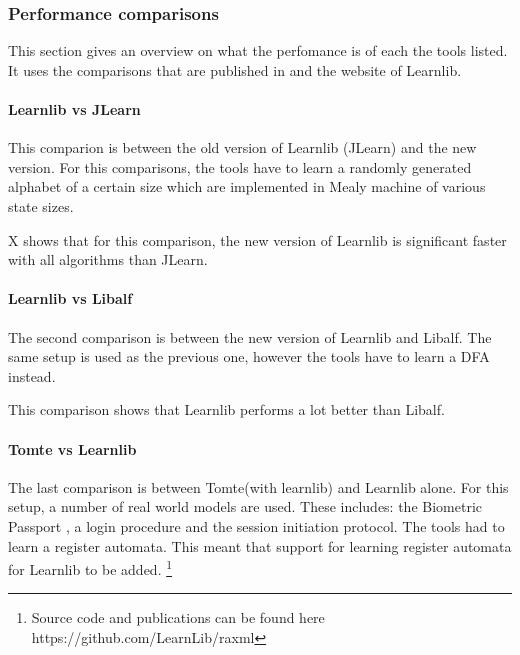 \documentclass[multi,crop=false,class=article]{standalone}
\begin{document}
\subsubsection{Performance comparisons}
\label{ssec:performance_compare}
This section gives an overview on what the perfomance is of each the tools
listed. It uses the comparisons that are published in
\cite{Aarts2014}\cite{Aarts2015} and
the website of
Learnlib.

\paragraph{Learnlib vs JLearn}

\todo{Image of comparison between Learnlib and JLearn] }
This comparion is between the old version of Learnlib (JLearn) and the new
version. For this comparisons, the tools have to learn a randomly generated
alphabet of a certain size which are implemented in Mealy machine of various
state sizes.

X shows that for this comparison, the new version of Learnlib is
significant faster with all algorithms than JLearn.

\paragraph{Learnlib vs Libalf}
The second comparison is between the new version of Learnlib and Libalf.
The same setup is used as the previous one, however the tools have to learn a
DFA instead.

This comparison shows that Learnlib performs a lot better than Libalf.

\paragraph{Tomte vs Learnlib}
The last comparison is between Tomte(with learnlib) and Learnlib alone.
For this setup, a number of real world models are used. These includes: the
Biometric Passport \cite{Aarts2010}, a login procedure and the session
initiation protocol. The tools had to learn a register automata. This meant
that support for learning register automata for Learnlib to be added.
\footnote{Source code and publications can be found here
https://github.com/LearnLib/raxml}
\end{document}
